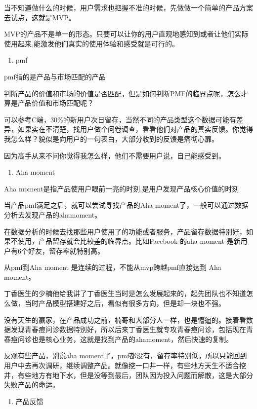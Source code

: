 \documentclass[letterpaper,11pt,english]{sphinxmanual}
\begin{document}
当不知道做什么的时候，用户需求也把握不准的时候，先做做一个简单的产品方案去试点，这就是MVP。

MVP的产品不是单一的形态。只要可以让你的用户直观地感知到或者让他们实际使用起来,能激发他们真实的使用体验和感受就是可行的。
\begin{enumerate}
%
\item {} 
pmf

\end{enumerate}

pmf指的是产品与市场匹配的产品

判断产品的价值和市场的价值是否匹配，但是如何判断PMF的临界点呢，怎么才算是产品价值和市场匹配呢？

可以参考C端，30\%的新用户次日留存，当然不同的产品类型这个数据可能有差异，如果实在不清楚，找用户做个问卷调查，看看他们对产品的真实反馈。你觉得我怎么样？貌似是向用户的一句表白，大部分收到的反馈是痛彻心扉。

因为高手从来不问你觉得我怎么样，他们不需要用户说，自己能感受到。
\begin{enumerate}
%
\setcounter{enumi}{2}
\item {} 
Aha moment

\end{enumerate}

Aha moment是指产品使用户眼前一亮的时刻,是用户发现产品核心价值的时刻

当产品pmf满足之后，就可以尝试寻找产品的Aha
moment了，一般可以通过数据分析去发现产品的ahamoment。

在数据分析的时候去找那些用户使用了的功能或者服务，产品留存数据特别好，如果不使用，产品留存就会比较差的临界点。比如Facebook
的aha moment 是新用户有6个好友，留存率就特别高。

从pmf到Aha moment 是连续的过程，不能从mvp跨越pmf直接达到 Aha moment。

丁香医生的少楠他给我讲了丁香医生当时是怎么发展起来的，起先团队也不知道怎么做，当时产品模型搭建好之后，看似有很多方向，但是却一块也不强。

没有天生的赢家，在产品成功之前，楠哥和大部分人一样，也是懵逼的。接着看数据发现青春痘问诊数据特别好，所以后来丁香医生就专攻青春痘问诊，包括现在青春痘问诊也是核心业务，这就是找到产品的ahamoment，然后快速的复制。

反观有些产品，别说aha
moment了，pmf都没有，留存率特别低，所以只能回到用户中去再次调研，继续调整产品。就像挖一口井一样，有些地方天生不适合挖井，有些地方有地下水，但是没等到最后，团队因为投入问题而解散，这是大部分失败产品的命运。
\begin{enumerate}
%
\item {} 
产品反馈
%
\begin{footnote}[285]\sphinxAtStartFootnote
{}
%
\end{footnote}

\end{enumerate}
\end{document}
